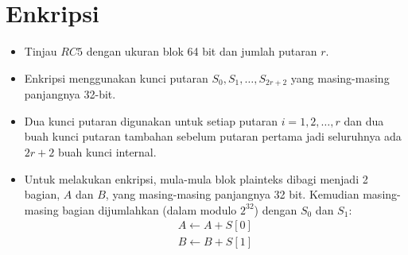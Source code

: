 \documentclass{article}
\begin{document}

\section*{Enkripsi}

\begin{itemize}
    \item Tinjau $RC5$ dengan ukuran blok 64 bit dan jumlah putaran $r$.
    \item Enkripsi menggunakan kunci putaran $S_0, S_1, \dots, S_{2r+2}$ yang masing-masing panjangnya 32-bit.
    \item Dua kunci putaran digunakan untuk setiap putaran $i = 1, 2, \dots, r$ dan dua buah kunci putaran tambahan sebelum putaran pertama jadi seluruhnya ada $2r + 2$ buah kunci internal.
    \item Untuk melakukan enkripsi, mula-mula blok plainteks dibagi menjadi 2 bagian, $A$ dan $B$, yang masing-masing panjangnya 32 bit. Kemudian masing-masing bagian dijumlahkan (dalam modulo $2^{32}$) dengan $S_0$ dan $S_1$:
    \[
    \begin{aligned}
    A \leftarrow A + S[0] \\
    B \leftarrow B + S[1]
    \end{aligned}
    \]
\end{itemize}
\end{document}
